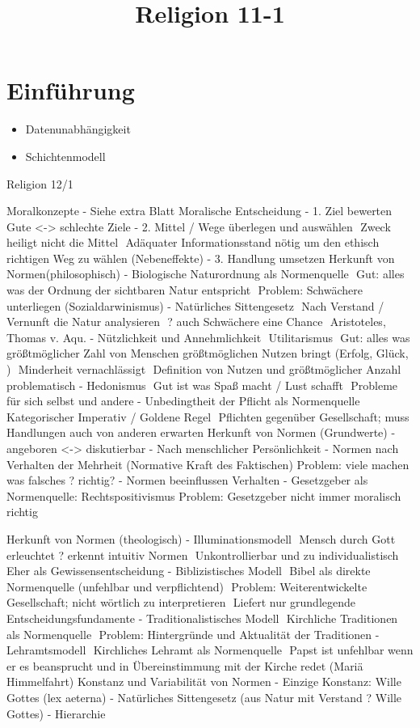 \documentclass[11pt, paper=a4, twocolumn]{scrartcl}
\title{\vspace{-1.25cm}Religion 11-1\vspace{-0.25cm}}
\date{\vspace{-5ex}}
\begin{document}
	\maketitle


	\section{Einführung}
		\begin{itemize}
			\item Datenunabhängigkeit
			\item Schichtenmodell
		\end{itemize}



Religion 12/1
 
Moralkonzepte
-	Siehe extra Blatt
Moralische Entscheidung
-	1. Ziel bewerten
	Gute <-> schlechte Ziele
-	2. Mittel / Wege überlegen und auswählen
	Zweck heiligt nicht die Mittel
	Adäquater Informationsstand nötig um den ethisch richtigen Weg zu wählen (Nebeneffekte)
-	3. Handlung umsetzen
Herkunft von Normen(philosophisch)
-	Biologische Naturordnung als Normenquelle
	Gut: alles was der Ordnung der sichtbaren Natur entspricht
	Problem: Schwächere unterliegen (Sozialdarwinismus)
-	Natürliches Sittengesetz
	Nach Verstand / Vernunft die Natur analysieren
	? auch Schwächere eine Chance
	Aristoteles, Thomas v. Aqu.
-	Nützlichkeit und Annehmlichkeit  Utilitarismus
	Gut: alles was größtmöglicher Zahl von Menschen größtmöglichen Nutzen bringt (Erfolg, Glück, )
	Minderheit vernachlässigt
	Definition von Nutzen und größtmöglicher Anzahl problematisch
-	Hedonismus
	Gut ist was Spaß macht / Lust schafft
	Probleme für sich selbst und andere
-	Unbedingtheit der Pflicht als Normenquelle
	Kategorischer Imperativ / Goldene Regel
	Pflichten gegenüber Gesellschaft; muss Handlungen auch von anderen erwarten
Herkunft von Normen (Grundwerte)
-	angeboren <-> diskutierbar
-	Nach menschlicher Persönlichkeit
-	Normen nach Verhalten der Mehrheit (Normative Kraft des Faktischen)
Problem: viele machen was falsches ? richtig?
-	Normen beeinflussen Verhalten
-	Gesetzgeber als Normenquelle: Rechtspositivismus
Problem: Gesetzgeber nicht immer moralisch richtig

Herkunft von Normen (theologisch)
-	Illuminationsmodell
	Mensch durch Gott erleuchtet ? erkennt intuitiv Normen
	Unkontrollierbar und zu individualistisch
	Eher als Gewissensentscheidung
-	Biblizistisches Modell
	Bibel als direkte Normenquelle (unfehlbar und verpflichtend)
	Problem: Weiterentwickelte Gesellschaft; nicht wörtlich zu interpretieren
	Liefert nur grundlegende Entscheidungsfundamente
-	Traditionalistisches Modell
	Kirchliche Traditionen als Normenquelle
	Problem: Hintergründe und Aktualität der Traditionen
-	Lehramtsmodell
	Kirchliches Lehramt als Normenquelle
	Papst ist unfehlbar wenn er es beansprucht und in Übereinstimmung mit der Kirche redet (Mariä Himmelfahrt)
Konstanz und Variabilität von Normen
-	Einzige Konstanz: Wille Gottes (lex aeterna)
-	Natürliches Sittengesetz (aus Natur mit Verstand ? Wille Gottes)
-	Hierarchie
\end{document}

